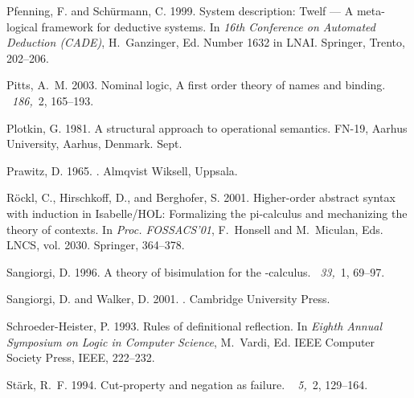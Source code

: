\documentclass{acmtrans2m}
\begin{document}
\begin{thebibliography}{}
{\sc Pfenning, F.} {\sc and} {\sc Sch{\"u}rmann, C.} 1999.
\newblock System description: Twelf --- {A} meta-logical framework for
  deductive systems.
\newblock In {\em 16th Conference on Automated Deduction (CADE)},
  {H.~Ganzinger}, Ed. Number 1632 in LNAI. Springer, Trento, 202--206.

{\sc Pitts, A.~M.} 2003.
\newblock Nominal logic, {A} first order theory of names and binding.
~{\em 186,\/}~2, 165--193.

{\sc Plotkin, G.} 1981.
\newblock A structural approach to operational semantics.
 {FN}-19, Aarhus University, Aarhus, Denmark. Sept.

{\sc Prawitz, D.} 1965.
.
\newblock Almqvist  Wiksell, Uppsala.

{\sc R{\"o}ckl, C.}, {\sc Hirschkoff, D.}, {\sc and} {\sc Berghofer, S.} 2001.
\newblock Higher-order abstract syntax with induction in {Isabelle/HOL}:
  Formalizing the pi-calculus and mechanizing the theory of contexts.
\newblock In {\em Proc. FOSSACS'01}, {F.~Honsell} {and} {M.~Miculan}, Eds.
  LNCS, vol. 2030. Springer, 364--378.

{\sc Sangiorgi, D.} 1996.
\newblock A theory of bisimulation for the -calculus.
~{\em 33,\/}~1, 69--97.

{\sc Sangiorgi, D.} {\sc and} {\sc Walker, D.} 2001.
.
\newblock Cambridge University Press.

{\sc Schroeder-Heister, P.} 1993.
\newblock Rules of definitional reflection.
\newblock In {\em Eighth {Annual Symposium on Logic in Computer Science}},
  {M.~Vardi}, Ed. IEEE Computer Society Press, IEEE, 222--232.

{\sc St{\"a}rk, R.~F.} 1994.
\newblock Cut-property and negation as failure.
~{\em
  5,\/}~2, 129--164.


\end{thebibliography}
\end{document}
